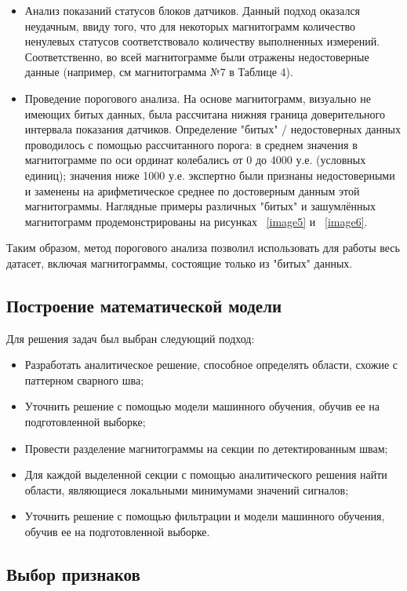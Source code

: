 \documentclass[a4paper,article,14pt]{extarticle}
\begin{document}
\begin{itemize}
    \item Анализ показаний статусов блоков датчиков. Данный подход оказался неудачным, ввиду того, что для некоторых магнитограмм количество ненулевых статусов соответствовало количеству выполненных измерений. Соответственно, во всей магнитограмме были отражены недостоверные данные (например, см магнитограмма №7 в Таблице 4).
    \item Проведение порогового анализа. На основе магнитограмм, визуально не имеющих битых данных, была рассчитана нижняя граница доверительного интервала показания датчиков. Определение "битых" / недостоверных данных проводилось с помощью рассчитанного порога: в среднем значения в магнитограмме по оси ординат колебались от 0 до 4000 у.е. (условных единиц); значения ниже 1000 у.е. экспертно были признаны недостоверными и заменены на арифметическое среднее по достоверным данным этой магнитограммы. Наглядные примеры различных "битых" и зашумлённых магнитограмм продемонстрированы на рисунках ~\ref{image5} и ~\ref{image6}.
\end{itemize}

Таким образом, метод порогового анализа позволил использовать для работы весь датасет, 
включая магнитограммы, состоящие только из "битых" данных. 

\subsection{Построение математической модели}

Для решения задач был выбран следующий подход:
\begin{itemize}
    \item Разработать аналитическое решение, способное определять области, схожие с паттерном сварного шва;
    \item Уточнить решение с помощью модели машинного обучения, обучив ее на подготовленной выборке;
    \item Провести разделение магнитограммы на секции по детектированным швам;
    \item Для каждой выделенной секции с помощью аналитического решения найти области, являющиеся локальными минимумами значений сигналов;
    \item Уточнить решение с помощью фильтрации и модели машинного обучения, обучив ее на подготовленной выборке.
\end{itemize}

\subsection{Выбор признаков}
\end{document}
